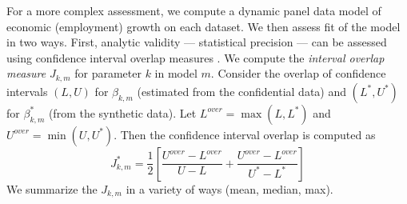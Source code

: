 For a more complex assessment, we compute a dynamic panel data model of economic (employment) growth on each dataset. We then assess fit of the model in two ways.  First, analytic validity --- statistical precision --- can be assessed using confidence interval overlap measures   \citep{tas2006}. 
We compute the \emph{interval overlap measure} $J_{k,m}$ for parameter $k$ in model $m$. Consider the overlap of confidence intervals $(L,U)$ for $\beta_{k,m}$ (estimated from the confidential data) and $(L^{*},U^{*})$ for $\beta_{k,m}^*$ (from the synthetic data). Let $L^{over} = \max (L,L^{*} )$ and $U^{over} = \min (U,U^{*})$. Then the confidence interval  overlap  is computed as
$$
J_{k,m}^{*} = \frac{1}{2} \left [ \frac{U^{over} - L^{over}}{U-L} + \frac{U^{over} - L^{over}}{U^*-L ^*}        \right ]
$$
We summarize  the $J_{k,m}$ in a variety of ways (mean, median, max).